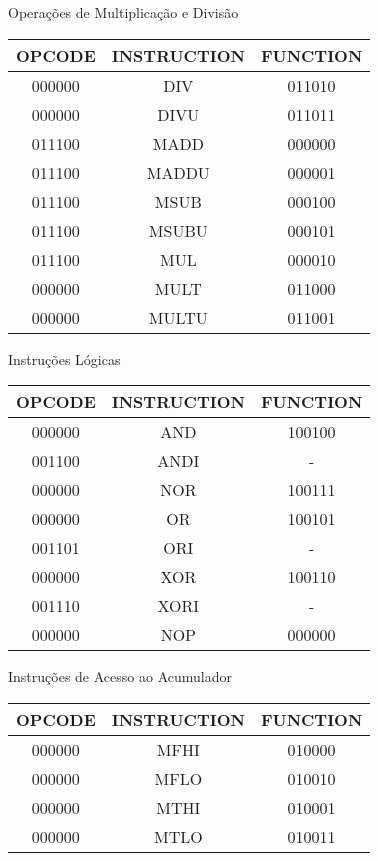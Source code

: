 Operações de Multiplicação e Divisão
\begin{table}[H]
\centering
	\begin{tabular}{|c|c|c|}
  	\hline 
  	\cellcolor[gray]{0.9}\textbf{OPCODE} & \cellcolor[gray]{0.9}\textbf{INSTRUCTION} & \cellcolor[gray]{0.9}\textbf{FUNCTION} \\ 
  	\hline 
  	000000 & DIV & 011010 \\ 
  	\hline 
  	000000 & DIVU & 011011 \\ 
  	\hline 
  	011100 & MADD & 000000 \\ 
  	\hline 
  	011100 & MADDU & 000001 \\ 
  	\hline  
  	011100 & MSUB & 000100 \\ 
  	\hline
  	011100 & MSUBU & 000101 \\
  	\hline 
  	011100 & MUL & 000010 \\
  	\hline 
  	000000 & MULT & 011000 \\
  	\hline
  	000000 & MULTU & 011001 \\
  	\hline
  	\end{tabular} 
  \end{table} 
	
Instruções Lógicas
\begin{table}[H]
\centering	
\begin{tabular}{|c|c|c|}
	\hline 
  \cellcolor[gray]{0.9}\textbf{OPCODE} & \cellcolor[gray]{0.9}\textbf{INSTRUCTION} & \cellcolor[gray]{0.9}\textbf{FUNCTION} \\ 
  	\hline 
	000000 & AND & 100100 \\ 
	\hline 
	001100 & ANDI & -\\ 
	\hline 
	000000 & NOR & 100111\\ 
	\hline 
	000000 & OR & 100101\\ 
	\hline
	001101 & ORI & -\\ 
	\hline 
	000000 & XOR & 100110 \\
	\hline
	001110 & XORI & -\\ 
  	\hline 
  	000000 & NOP & 000000\\ 
  	\hline
	\end{tabular} 
\end{table}	
	
Instruções de Acesso ao Acumulador
\begin{table}[H]
\centering 	
  	\begin{tabular}{|c|c|c|}
  	\hline 
  	\cellcolor[gray]{0.9}\textbf{OPCODE} & \cellcolor[gray]{0.9}\textbf{INSTRUCTION} & \cellcolor[gray]{0.9}\textbf{FUNCTION} \\ 
  	\hline 
  	000000 & MFHI & 010000 \\ 
  	\hline 
  	000000 & MFLO & 010010 \\ 
  	\hline 
  	000000 & MTHI & 010001 \\ 
  	\hline 
  	000000 & MTLO & 010011 \\ 
  	\hline 
  	\end{tabular} 
\end{table}

